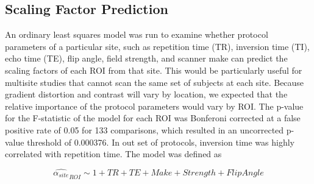 \subsection{Scaling Factor Prediction}

An ordinary least squares model was run to examine whether protocol parameters of a particular site, such as repetition time (TR), inversion time (TI), echo time (TE), flip angle, field strength, and scanner make can predict the scaling factors of each ROI from that site. This would be particularly useful for multisite studies that cannot scan the same set of subjects at each site. Because gradient distortion and contrast will vary by location, we expected that the relative importance of the protocol parameters would vary by ROI. The p-value for the F-statistic of the model for each ROI was Bonferoni corrected at a false positive rate of 0.05 for 133 comparisons, which resulted in an uncorrected p-value threshold of 0.000376. In out set of protocols, inversion time was highly correlated with repetition time. The model was defined as

\begin{equation}
\hat{\alpha_{site}}_{ROI} \sim 1 + TR + TE + Make + Strength + FlipAngle
\end{equation}